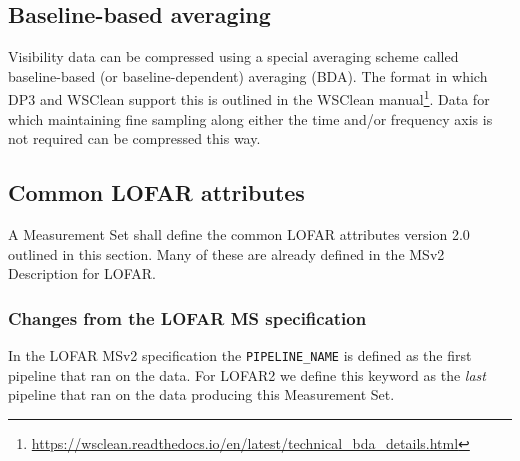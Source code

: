 \documentclass[a4paper,10pt,bibtotoc]{scrartcl}
\begin{document}
\subsection{Baseline-based averaging}
Visibility data can be compressed using a special averaging scheme called baseline-based (or baseline-dependent) averaging (BDA). The format in which DP3 and WSClean support this is outlined in the WSClean manual\footnote{\url{https://wsclean.readthedocs.io/en/latest/technical_bda_details.html}}. Data for which maintaining fine sampling along either the time and/or frequency axis is not required can be compressed this way.

\subsection{Common LOFAR attributes}
A Measurement Set shall define the common LOFAR attributes version 2.0 outlined in this section. Many of these are already defined in the MSv2 Description for LOFAR.

\subsubsection{Changes from the LOFAR MS specification}
In the LOFAR MSv2 specification the \texttt{PIPELINE\_NAME} is defined as the first pipeline that ran on the data. For LOFAR2 we define this keyword as the \textit{last} pipeline that ran on the data producing this Measurement Set.


\end{document}
